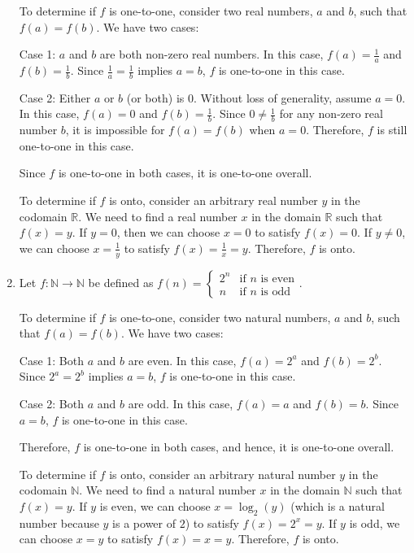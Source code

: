 \documentclass{article}
\newcommand{\N}{\mathbb{N}}
\newcommand{\R}{\mathbb{R}}
\theoremstyle{definition}
\begin{document}
\begin{solution}
\begin{enumerate}
    To determine if $f$ is one-to-one, consider two real numbers, $a$ and $b$, such that $f(a) = f(b)$. We have two cases:

    Case 1: $a$ and $b$ are both non-zero real numbers. In this case, $f(a) = \frac{1}{a}$ and $f(b) = \frac{1}{b}$. Since $\frac{1}{a} = \frac{1}{b}$ implies $a = b$, $f$ is one-to-one in this case.

    Case 2: Either $a$ or $b$ (or both) is $0$. Without loss of generality, assume $a = 0$. In this case, $f(a) = 0$ and $f(b) = \frac{1}{b}$. Since $0 \neq \frac{1}{b}$ for any non-zero real number $b$, it is impossible for $f(a) = f(b)$ when $a = 0$. Therefore, $f$ is still one-to-one in this case.

    Since $f$ is one-to-one in both cases, it is one-to-one overall.

    To determine if $f$ is onto, consider an arbitrary real number $y$ in the codomain $\R$. We need to find a real number $x$ in the domain $\R$ such that $f(x) = y$. If $y = 0$, then we can choose $x = 0$ to satisfy $f(x) = 0$. If $y \neq 0$, we can choose $x = \frac{1}{y}$ to satisfy $f(x) = \frac{1}{x} = y$. Therefore, $f$ is onto.

    \item Let $f : \N \to \N$ be defined as $f(n) = \begin{cases}
            2^n & \text{if } n \text{ is even} \\
            n & \text{if } n \text{ is odd}
        \end{cases}$.

    To determine if $f$ is one-to-one, consider two natural numbers, $a$ and $b$, such that $f(a) = f(b)$. We have two cases:

    Case 1: Both $a$ and $b$ are even. In this case, $f(a) = 2^a$ and $f(b) = 2^b$. Since $2^a = 2^b$ implies $a = b$, $f$ is one-to-one in this case.

    Case 2: Both $a$ and $b$ are odd. In this case, $f(a) = a$ and $f(b) = b$. Since $a = b$, $f$ is one-to-one in this case.

    Therefore, $f$ is one-to-one in both cases, and hence, it is one-to-one overall.

    To determine if $f$ is onto, consider an arbitrary natural number $y$ in the codomain $\N$. We need to find a natural number $x$ in the domain $\N$ such that $f(x) = y$. If $y$ is even, we can choose $x = \log_2(y)$ (which is a natural number because $y$ is a power of $2$) to satisfy $f(x) = 2^x = y$. If $y$ is odd, we can choose $x = y$ to satisfy $f(x) = x = y$. Therefore, $f$ is onto.


\end{enumerate}
\end{solution}
\end{document}
